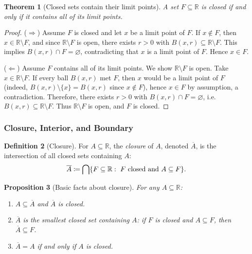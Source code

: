 \documentclass[12pt]{article}
\numberwithin{equation}{section}
\newcommand{\RR}{\mathbb{R}}
\let\emptyset\varnothing
\DeclarePairedDelimiter{\set}{\{}{\}}
\theoremstyle{plain}
\newtheorem{theorem}{Theorem}[section]
\newtheorem{proposition}[theorem]{Proposition}
\theoremstyle{definition}
\newtheorem{definition}[theorem]{Definition}
\theoremstyle{remark}
\begin{document}
\begin{theorem}[Closed sets contain their limit points]\label{thm:closed-limit-points}
A set $F\subseteq\RR$ is closed if and only if it contains all of its limit points.
\end{theorem}

\begin{proof}
($\Rightarrow$) Assume $F$ is closed and let $x$ be a limit point of $F$.
If $x\notin F$, then $x\in \RR\setminus F$, and since $\RR\setminus F$ is open, there exists $r>0$ with
$B(x,r)\subseteq \RR\setminus F$. This implies $B(x,r)\cap F=\emptyset$, contradicting that $x$ is a limit point of $F$.
Hence $x\in F$.

($\Leftarrow$) Assume $F$ contains all of its limit points. We show $\RR\setminus F$ is open.
Take $x\in \RR\setminus F$. If every ball $B(x,r)$ met $F$, then $x$ would be a limit point of $F$ (indeed, $B(x,r)\setminus\{x\}=B(x,r)$ since $x\notin F$),
hence $x\in F$ by assumption, a contradiction. Therefore, there exists $r>0$ with $B(x,r)\cap F=\emptyset$, i.e.\ $B(x,r)\subseteq \RR\setminus F$.
Thus $\RR\setminus F$ is open, and $F$ is closed.
\end{proof}

\subsubsection{Closure, Interior, and Boundary}

\begin{definition}[Closure]\label{def:closure}
For $A\subseteq \RR$, the \emph{closure} of $A$, denoted $\overline{A}$, is the intersection of all closed sets containing $A$:
\[
\overline{A} \coloneqq \bigcap\set{F\subseteq\RR:\ F\text{ closed and }A\subseteq F}.
\]
\end{definition}

\begin{proposition}[Basic facts about closure]\label{prop:closure-basic}
For any $A\subseteq\RR$:
\begin{enumerate}[label=(\alph*)]
\item $A\subseteq \overline{A}$ and $\overline{A}$ is closed.
\item $\overline{A}$ is the \emph{smallest} closed set containing $A$: if $F$ is closed and $A\subseteq F$, then $\overline{A}\subseteq F$.
\item $\overline{A}=A$ if and only if $A$ is closed.
\end{enumerate}
\end{proposition}
\end{document}
